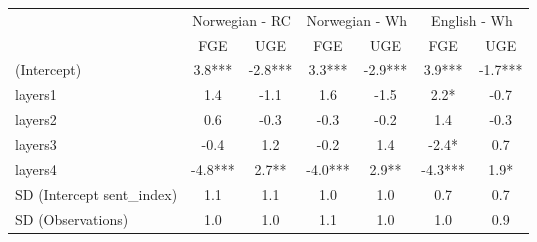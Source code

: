 \begin{longtable}{lcccccc}
\toprule
 & \multicolumn{2}{c}{Norwegian - RC} & \multicolumn{2}{c}{Norwegian - Wh} & \multicolumn{2}{c}{English - Wh} \\ 
\cmidrule(lr){2-3} \cmidrule(lr){4-5} \cmidrule(lr){6-7}
  & FGE & UGE & FGE & UGE & FGE & UGE \\ 
\midrule\addlinespace[2.5pt]
(Intercept) & 3.8*** & -2.8*** & 3.3*** & -2.9*** & 3.9*** & -1.7*** \\ 
layers1 & 1.4 & -1.1 & 1.6 & -1.5 & 2.2* & -0.7 \\ 
layers2 & 0.6 & -0.3 & -0.3 & -0.2 & 1.4 & -0.3 \\ 
layers3 & -0.4 & 1.2 & -0.2 & 1.4 & -2.4* & 0.7 \\ 
layers4 & -4.8*** & 2.7** & -4.0*** & 2.9** & -4.3*** & 1.9* \\ 
SD (Intercept sent\_index) & 1.1 & 1.1 & 1.0 & 1.0 & 0.7 & 0.7 \\ 
SD (Observations) & 1.0 & 1.0 & 1.1 & 1.0 & 1.0 & 0.9 \\ 
\bottomrule
\end{longtable}

